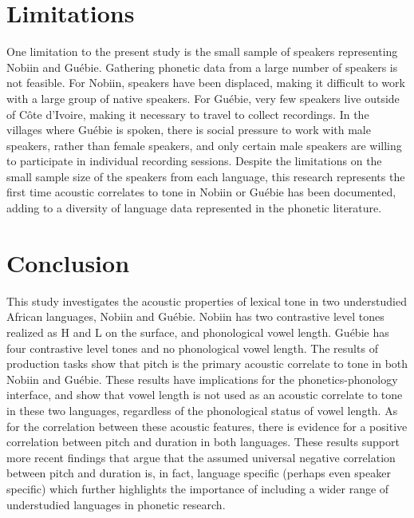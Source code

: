 \documentclass[output=paper]{langscibook}
\begin{document}
\section{Limitations}
One limitation to the present study is the small sample of speakers representing Nobiin and Guébie. Gathering phonetic data from a large number of speakers is not feasible. For Nobiin, speakers have been displaced, making it difficult to work with a large group of native speakers. For Guébie, very few speakers live outside of C\^ote d'Ivoire, making it necessary to travel to collect recordings. In the villages where Guébie is spoken, there is social pressure to work with male speakers, rather than female speakers, and only certain male speakers are willing to participate in individual recording sessions. Despite the limitations on the small sample size of the speakers from each language, this research represents the first time acoustic correlates to tone in Nobiin or Guébie has been documented, adding to a diversity of language data represented in the phonetic literature.


\section{Conclusion}
This study investigates the acoustic properties of lexical tone in two understudied African languages, Nobiin and Guébie. Nobiin has two contrastive level tones realized as H and L on the surface, and phonological vowel length. Guébie has four contrastive level tones and no phonological vowel length. The results of production tasks show that pitch is the primary acoustic correlate to tone in both Nobiin and Guébie. These results have implications for the phonetics-phonology interface, and show that vowel length is not used as an acoustic correlate to tone in these two languages, regardless of the phonological status of vowel length. As for the correlation between these acoustic features, there is evidence for a positive correlation between pitch and duration in both languages. These results support more recent findings that argue that the assumed universal negative correlation between pitch and duration is, in fact, language specific (perhaps even speaker specific) which further highlights the importance of including a wider range of understudied languages in phonetic research.
\end{document}
